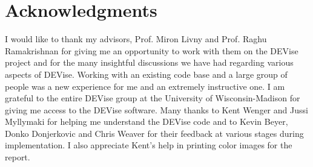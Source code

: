 \section{Acknowledgments}

I would like to thank my advisors, Prof. Miron Livny and Prof. Raghu 
Ramakrishnan for giving me an opportunity to work with them on the
DEVise project and for the many insightful discussions we have had
regarding various aspects of DEVise. Working with an existing code base and 
a large group of people was a new experience for me and an extremely
 instructive one. I am grateful to the entire DEVise group at the University of
Wisconsin-Madison for giving me access to the DEVise software. Many thanks to
Kent Wenger and Jussi Myllymaki for helping me understand the DEVise code
and to Kevin Beyer, Donko Donjerkovic and Chris Weaver for their feedback
at various stages during implementation. I also appreciate Kent's help in
printing color images for the report.


